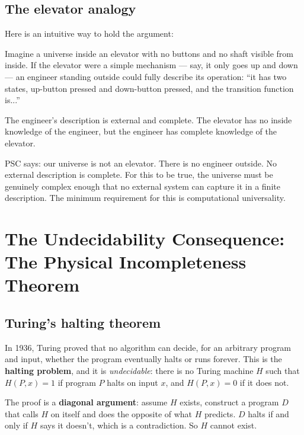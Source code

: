 \documentclass[11pt,a4paper]{article}
\newcommand{\term}[1]{\textbf{#1}}
\begin{document}
\subsection{The elevator analogy}

Here is an intuitive way to hold the argument:

Imagine a universe inside an elevator with no buttons and no shaft visible from
inside.  If the elevator were a simple mechanism — say, it only goes up and down
— an engineer standing outside could fully describe its operation: ``it has two
states, up-button pressed and down-button pressed, and the transition function is...''

The engineer's description is external and complete.  The elevator has no inside
knowledge of the engineer, but the engineer has complete knowledge of the elevator.

PSC says: our universe is not an elevator.  There is no engineer outside.  No external
description is complete.  For this to be true, the universe must be genuinely
complex enough that no external system can capture it in a finite description.
The minimum requirement for this is computational universality.

\section{The Undecidability Consequence: The Physical Incompleteness Theorem}
\label{sec:pit}

\subsection{Turing's halting theorem}

In 1936, Turing proved that no algorithm can decide, for an arbitrary program and input,
whether the program eventually halts or runs forever.  This is the
\term{halting problem}, and it is \emph{undecidable}: there is no Turing machine $H$
such that $H(P, x) = 1$ if program $P$ halts on input $x$, and $H(P, x) = 0$ if it
does not.

The proof is a \term{diagonal argument}: assume $H$ exists, construct a program $D$
that calls $H$ on itself and does the opposite of what $H$ predicts.  $D$ halts if
and only if $H$ says it doesn't, which is a contradiction.  So $H$ cannot exist.
\end{document}
